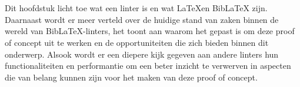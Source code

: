 \chapter{}%
\label{ch:stand-van-zaken}






Dit hoofdstuk licht toe wat een linter is en wat \LaTeX en BibLaTeX zijn. Daarnaast wordt er meer verteld over de huidige stand van zaken binnen de wereld van BibLaTeX-linters, het toont aan waarom het gepast is om deze proof of concept uit te werken en de opportuniteiten die zich bieden binnen dit onderwerp. Alsook wordt er een diepere kijk gegeven aan andere linters hun functionaliteiten en performantie om een beter inzicht te verwerven in aspecten die van belang kunnen zijn voor het maken van deze proof of concept.

